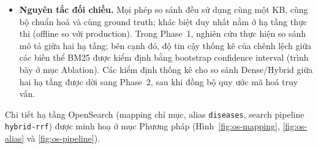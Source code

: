\begin{itemize}
    \item \textbf{Nguyên tắc đối chiếu.} Mọi phép so sánh đều sử dụng cùng một KB, cùng bộ chuẩn hoá và cùng ground truth; khác biệt duy nhất nằm ở hạ tầng thực thi (offline so với production). Trong Phase~1, nghiên cứu thực hiện so sánh mô tả giữa hai hạ tầng; bên cạnh đó, độ tin cậy thống kê của chênh lệch giữa các biến thể BM25 được kiểm định bằng bootstrap confidence interval (trình bày ở mục Ablation). Các kiểm định thống kê cho so sánh Dense/Hybrid giữa hai hạ tầng được dời sang Phase~2, sau khi đồng bộ quy ước mã hoá truy vấn.
\end{itemize}


Chi tiết hạ tầng OpenSearch (mapping chỉ mục, alias \texttt{diseases}, search pipeline \texttt{hybrid-rrf}) được minh hoạ ở mục Phương pháp (Hình~\ref{fig:os-mapping}, \ref{fig:os-alias} và \ref{fig:os-pipeline}).
